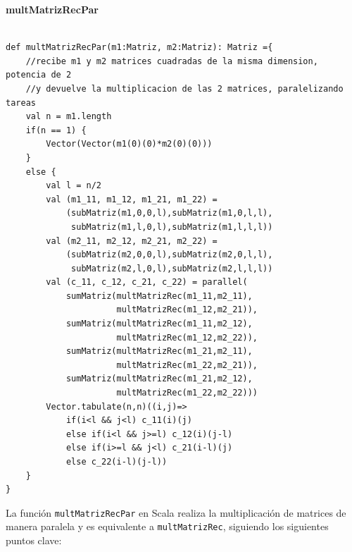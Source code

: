 \documentclass[12pt, a4paper]{article}
\begin{document}
\textbf{{multMatrizRecPar}} \\ \\
\begin{lstlisting}[caption=mult matriz recursiva paralela, label=lst:scala_code9]
def multMatrizRecPar(m1:Matriz, m2:Matriz): Matriz ={
    //recibe m1 y m2 matrices cuadradas de la misma dimension, potencia de 2
    //y devuelve la multiplicacion de las 2 matrices, paralelizando tareas
    val n = m1.length
    if(n == 1) {
        Vector(Vector(m1(0)(0)*m2(0)(0)))
    }
    else {
        val l = n/2
        val (m1_11, m1_12, m1_21, m1_22) = 
            (subMatriz(m1,0,0,l),subMatriz(m1,0,l,l),
             subMatriz(m1,l,0,l),subMatriz(m1,l,l,l))
        val (m2_11, m2_12, m2_21, m2_22) =
            (subMatriz(m2,0,0,l),subMatriz(m2,0,l,l),
             subMatriz(m2,l,0,l),subMatriz(m2,l,l,l))
        val (c_11, c_12, c_21, c_22) = parallel(
            sumMatriz(multMatrizRec(m1_11,m2_11),
                      multMatrizRec(m1_12,m2_21)),
            sumMatriz(multMatrizRec(m1_11,m2_12),
                      multMatrizRec(m1_12,m2_22)),
            sumMatriz(multMatrizRec(m1_21,m2_11),
                      multMatrizRec(m1_22,m2_21)),
            sumMatriz(multMatrizRec(m1_21,m2_12),
                      multMatrizRec(m1_22,m2_22)))
        Vector.tabulate(n,n)((i,j)=>
            if(i<l && j<l) c_11(i)(j)
            else if(i<l && j>=l) c_12(i)(j-l)
            else if(i>=l && j<l) c_21(i-l)(j)
            else c_22(i-l)(j-l))
    }
}
\end{lstlisting}
La función \texttt{multMatrizRecPar} en Scala realiza la multiplicación de matrices de manera paralela y es equivalente a \texttt{multMatrizRec}, siguiendo los siguientes puntos clave:
\end{document}
